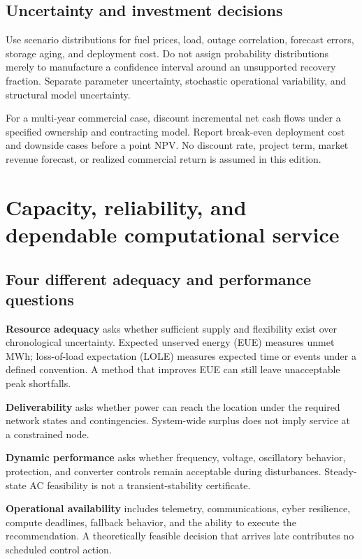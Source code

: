 \documentclass[11pt,letterpaper]{article}
\begin{document}
\subsection{Uncertainty and investment decisions}
Use scenario distributions for fuel prices, load, outage correlation, forecast errors, storage aging, and deployment cost. Do not assign probability distributions merely to manufacture a confidence interval around an unsupported recovery fraction. Separate parameter uncertainty, stochastic operational variability, and structural model uncertainty.

For a multi-year commercial case, discount incremental net cash flows under a specified ownership and contracting model. Report break-even deployment cost and downside cases before a point NPV. No discount rate, project term, market revenue forecast, or realized commercial return is assumed in this edition.

\section{Capacity, reliability, and dependable computational service}
\label{sec:reliability}
\subsection{Four different adequacy and performance questions}
\textbf{Resource adequacy} asks whether sufficient supply and flexibility exist over chronological uncertainty. Expected unserved energy (EUE) measures unmet MWh; loss-of-load expectation (LOLE) measures expected time or events under a defined convention. A method that improves EUE can still leave unacceptable peak shortfalls.

\textbf{Deliverability} asks whether power can reach the location under the required network states and contingencies. System-wide surplus does not imply service at a constrained node.

\textbf{Dynamic performance} asks whether frequency, voltage, oscillatory behavior, protection, and converter controls remain acceptable during disturbances. Steady-state AC feasibility is not a transient-stability certificate.

\textbf{Operational availability} includes telemetry, communications, cyber resilience, compute deadlines, fallback behavior, and the ability to execute the recommendation. A theoretically feasible decision that arrives late contributes no scheduled control action.
\end{document}
